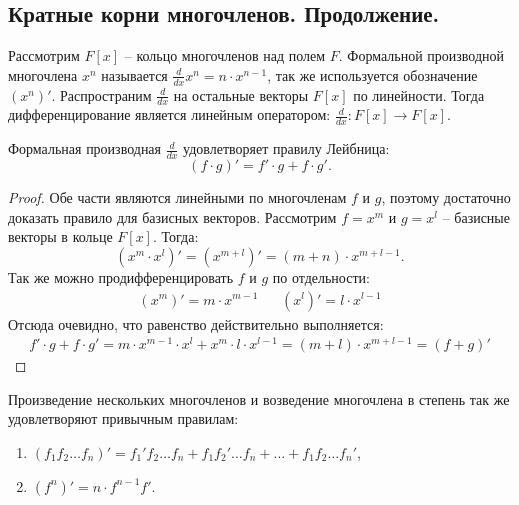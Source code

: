 
\subsection{Кратные корни многочленов. Продолжение.}

\begin{definition}
    Рассмотрим $F[x]$ -- кольцо многочленов над полем $F$.
    Формальной производной многочлена $x^n$ называется $\frac{d}{dx} x^n = n \cdot x^{n-1}$, 
    так же используется обозначение $(x^n)'$. Распространим $\frac{d}{dx}$ на остальные векторы 
    $F[x]$ по линейности. Тогда дифференцирование является линейным оператором: 
    $\frac{d}{dx}: F[x] \to F[x]$.
\end{definition}

\begin{proposition}
    Формальная производная $\frac{d}{dx}$ удовлетворяет правилу Лейбница: 
    $$(f \cdot g)' = f' \cdot g + f \cdot g'.$$
\end{proposition}

\begin{proof}
    Обе части являются линейными по многочленам $f$ и $g$, поэтому достаточно доказать правило 
    для базисных векторов. Рассмотрим $f = x^m$ и $g = x^l$ -- базисные векторы в кольце $F[x]$. 
    Тогда: $$(x^m \cdot x^l)' = (x^{m+l})' = (m+n) \cdot x^{m+l-1}.$$
    Так же можно продифференцировать $f$ и $g$ по отдельности: 
    \begin{align*}
        (x^m)' = m \cdot x^{m-1} && (x^l)' = l \cdot x^{l-1} 
    \end{align*}
    Отсюда очевидно, что равенство действительно выполняется:
    \begin{gather*}
        f' \cdot g + f \cdot g' = m \cdot x^{m-1} \cdot x^{l} + x^{m} \cdot l \cdot x^{l-1} = 
        (m+l) \cdot x^{m+l-1} = (f+g)'
    \end{gather*}
\end{proof}

\begin{corollary}
    Произведение нескольких многочленов и возведение многочлена в степень так же удовлетворяют 
    привычным правилам:
    \begin{enumerate}
        \item $(f_1 f_2 \dots f_n)' = f_1' f_2 \dots f_n + f_1 f_2' \dots f_n + \dots + f_1 f_2 \dots f_n'$,
        \item $(f^n)' = n \cdot f^{n-1} f'$.
    \end{enumerate}
\end{corollary}

